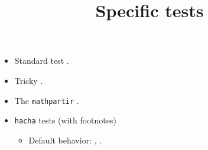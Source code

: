 \documentclass{article}
\title{Specific tests}
\author{}
\date{}
\begin{document}
\maketitle
\begin{itemize}
\item Standard test .
\item Tricky .
\item The \texttt{mathpartir} .
\item \texttt{hacha} tests (with footnotes)
\begin{itemize}
\item Default behavior: ,
.
\end{itemize}
\end{itemize}
\end{document}
